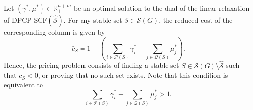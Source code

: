 \documentclass[preprint, 11pt, authoryear]{elsarticle}
\newcommand{\PP}{{\mathcal P}}
\newcommand{\QQ}{{\mathcal Q}}
\newcommand{\R}{{\mathbb R}}
\newcommand{\STAB}{{\mathscr S}}
\newcommand{\setcoveringform}{\text{DPCP-SCF}}
\begin{document}

Let $(\gamma^*, \mu^*) \in \mathbb{R}_+^{n+m}$ be an optimal solution to the dual of the linear relaxation of $\setcoveringform(\hat{\STAB})$. For any stable set $S \in \STAB(G)$, the reduced cost of the corresponding column is given by
\[
\bar{c}_S = 1 - \left( \sum_{i \in \PP(S)} \gamma^*_i - \sum_{j \in \QQ(S)} \mu^*_j \right).
\]
Hence, the pricing problem consists of finding a stable set $S \in \STAB(G) \setminus \hat{\STAB}$ such that $\bar{c}_S < 0$, or proving that no such set exists. Note that this condition is equivalent to
\[
\sum_{i \in \PP(S)} \gamma^*_i - \sum_{j \in \QQ(S)} \mu^*_j > 1.
\]

\end{document}
